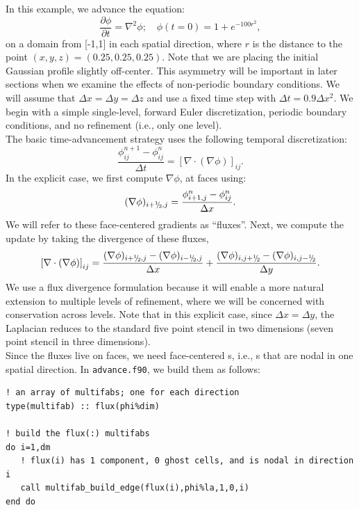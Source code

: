 In this example, we advance the equation:
\begin{equation}
\frac{\partial\phi}{\partial t} = \nabla^2 \phi; \quad \phi(t=0) = 1 + e^{-100r^2},
\end{equation}
on a domain from [-1,1] in each spatial direction, where $r$ is the distance
to the point $(x,y,z) = (0.25,0.25,0.25)$.  Note that we are placing the
initial Gaussian profile slightly off-center.  This asymmetry will be important
in later sections when we examine the effects of non-periodic boundary conditions.
We will assume that $\Delta x = \Delta y = \Delta z$ and use a fixed
time step with $\Delta t = 0.9\Delta x^2$.  We begin with a simple 
single-level, forward Euler discretization, periodic boundary conditions,
and no refinement (i.e., only one level).\\

The basic time-advancement strategy uses the following temporal discretization:
\begin{equation}
\frac{\phi_{ij}^{n+1} - \phi_{ij}^n}{\Delta t} = \left[\nabla\cdot(\nabla\phi)\right]_{ij}.
\end{equation}
In the explicit case, we first compute $\nabla\phi$, at faces using:
\begin{equation}
(\nabla\phi)_{i+\myhalf,j} = \frac{\phi_{i+1,j}^n-\phi_{ij}^n}{\Delta x}.
\end{equation}
We will refer to these face-centered gradients as ``fluxes''.
Next, we compute the update by taking the divergence of these fluxes,
\begin{equation}
\left[\nabla\cdot(\nabla\phi)\right]_{ij} = \frac{(\nabla\phi)_{i+\myhalf,j}-(\nabla\phi)_{i-\myhalf,j}}{\Delta x} + \frac{(\nabla\phi)_{i,j+\myhalf}-(\nabla\phi)_{i,j-\myhalf}}{\Delta y}.
\end{equation}
We use a flux divergence formulation because it will enable a more natural 
extension to multiple levels of refinement, where we will be concerned with
conservation across levels.  Note that in this explicit case, since $\Delta x = \Delta y$, 
the Laplacian reduces to the standard five point stencil in two dimensions
(seven point stencil in three dimensions).\\

Since the fluxes live on faces, we need face-centered \MultiFab s, i.e.,
\MultiFab s that are nodal in one spatial direction.  In {\tt advance.f90},
we build them as follows:
\begin{lstlisting}[backgroundcolor=\color{light-green}]
! an array of multifabs; one for each direction
type(multifab) :: flux(phi%dim) 

! build the flux(:) multifabs
do i=1,dm
   ! flux(i) has 1 component, 0 ghost cells, and is nodal in direction i
   call multifab_build_edge(flux(i),phi%la,1,0,i)
end do
\end{lstlisting}

